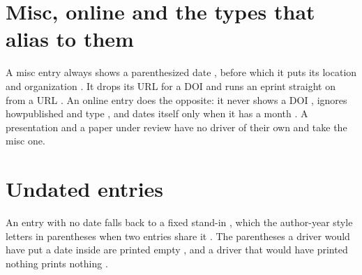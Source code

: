 \documentclass[acmsmall,nonacm,natbib=false]{acmart}
\begin{document}
\section*{Misc, online and the types that alias to them}
A misc entry always shows a parenthesized date \cite{MiscMonth}, before which it puts its location and organization \cite{MiscOrgLoc,MiscNoName}.
It drops its URL for a DOI \cite{MiscDoiUrl} and runs an eprint straight on from a URL \cite{MiscUrlEprint}.
An online entry does the opposite: it never shows a DOI \cite{OnlineDoiUrl,OnlineDoiOnly}, ignores howpublished and type \cite{OnlineHowOrg}, and dates itself only when it has a month \cite{VerOnline,OnlineWww}.
A presentation \cite{MiscPresentation} and a paper under review \cite{MiscUnderreview} have no driver of their own and take the misc one.

\section*{Undated entries}
An entry with no date falls back to a fixed stand-in \cite{NdArticle,NdMisc}, which the author-year style letters in parentheses when two entries share it \cite{NdDatasetA,NdDatasetB}.
The parentheses a driver would have put a date inside are printed empty \cite{NdDatasetMonth}, and a driver that would have printed nothing prints nothing \cite{NdOnline}.

\printbibliography
\end{document}
